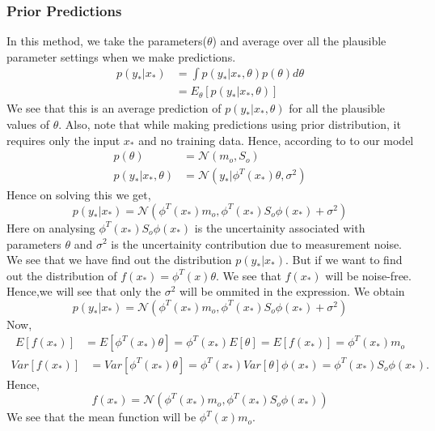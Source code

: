 \documentclass[12pt]{article}
\numberwithin{equation}{section}
\begin{document}
{\subsubsection{Prior Predictions}
In this method, we take the parameters($\theta$) and average over all the plausible parameter settings when we make predictions.
\begin{align*}
	 p(y_*|x_*) &= \int p(y_*|x_*, \theta)p(\theta)d\theta\\
	 &= E_\theta[p(y_*|x_*, \theta)]
\end{align*}
We see that this is an average prediction of $p(y_*|x_*, \theta)$ for all the plausible values of $\theta$. Also, note that while making predictions using prior distribution, it requires only the input $x_*$ and no training data. Hence, according to to our model
\begin{align*}
	p(\theta) &= \mathcal{N}(m_o, S_o)\\
	p(y_*|x_*, \theta) &= \mathcal{N}(y_*| \phi^T(x_*)\theta, \sigma^2)
\end{align*}
Hence on solving this we get,
\begin{equation*}
	p(y_*|x_*) = \mathcal{N}(\phi^T(x_*)m_o, \phi^T(x_*)S_o\phi(x_*) + \sigma^2)
\end{equation*}
Here on analysing $\phi^T(x_*)S_o\phi(x_*)$ is the uncertainity associated with parameters $\theta$ and $\sigma^2$ is the uncertainity contribution due to measurement noise. We see that we have find out the distribution $p(y_*|x_*)$. But if we want to find out the distribution of $f(x_*) = \phi^T(x)\theta$. We see that $f(x_*)$ will be noise-free. Hence,we will see that only the $\sigma^2$ will be ommited in the expression. We obtain
\begin{equation*}
	p(y_*|x_*) = \mathcal{N}(\phi^T(x_*)m_o, \phi^T(x_*)S_o\phi(x_*) + \sigma^2)
\end{equation*}
Now, \begin{align*}
	E[f(x_*)] &= E[\phi^T(x_*)\theta]= \phi^T(x_*)E[\theta]=E[f(x_*)] = \phi^T(x_*)m_o
\end{align*}
\begin{align*}
	Var[f(x_*)] &= Var[\phi^T(x_*)\theta]= \phi^T(x_*)Var[\theta]\phi(x_*)= \phi^T(x_*)S_o\phi(x_*).
\end{align*}
Hence, 
\begin{equation*}
	f(x_*) = \mathcal{N}(\phi^T(x_*)m_o, \phi^T(x_*)S_o\phi(x_*))
\end{equation*}
We see that the mean function will be $\phi^T(x)m_o$.\\
}
\end{document}
